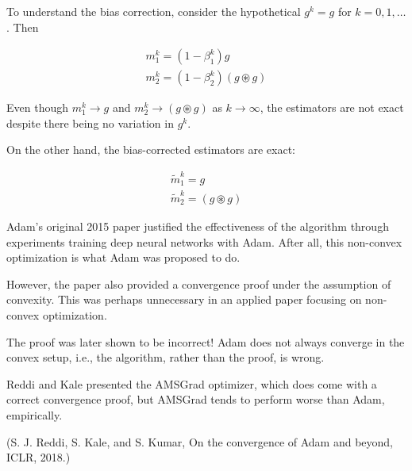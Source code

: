 \begin{concept}
    To understand the bias correction, consider the hypothetical $g^{k}=g$ for $k=0,1, \ldots$. Then

    $$
    \begin{gathered}
    m_{1}^{k}=\left(1-\beta_{1}^{k}\right) g \\
    m_{2}^{k}=\left(1-\beta_{2}^{k}\right)(g \circledast g)
    \end{gathered}
    $$

    Even though $m_{1}^{k} \rightarrow g$ and $m_{2}^{k} \rightarrow(g \circledast g)$ as $k \rightarrow \infty$, the estimators are not exact despite there being no variation in $g^{k}$.

    On the other hand, the bias-corrected estimators are exact:

    $$
    \begin{gathered}
    \widetilde{m}_{1}^{k}=g \\
    \widetilde{m}_{2}^{k}=(g \circledast g)
    \end{gathered}
    $$
\end{concept}

\begin{concept}
    Adam's original 2015 paper justified the effectiveness of the algorithm through experiments training deep neural networks with Adam. After all, this non-convex optimization is what Adam was proposed to do.

    However, the paper also provided a convergence proof under the assumption of convexity. This was perhaps unnecessary in an applied paper focusing on non-convex optimization.

    The proof was later shown to be incorrect! Adam does not always converge in the convex setup, i.e., the algorithm, rather than the proof, is wrong.

    Reddi and Kale presented the AMSGrad optimizer, which does come with a correct convergence proof, but AMSGrad tends to perform worse than Adam, empirically.

    (S. J. Reddi, S. Kale, and S. Kumar, On the convergence of Adam and beyond, ICLR, 2018.)
\end{concept}

